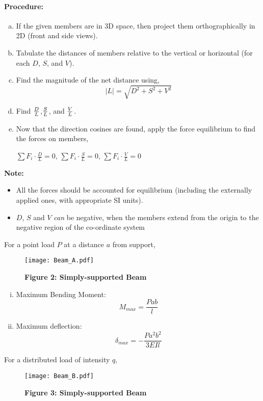 \documentclass{article}
\begin{document}
{\paragraph{\Large Procedure:}
\begin{enumerate}[(a)]
\item If the given members are in 3D space, then project them orthographically in 2D (front and side views).
\item Tabulate the distances of members relative to the vertical or horizontal (for each $D$, $S$, and $V$).
\item Find the magnitude of the net distance using,
{\LARGE $$|L|=\sqrt{D^2+S^2+V^2}$$}
\item Find {\LARGE $D\over L$},{\LARGE $S\over L$}, and {\LARGE $V\over L$}.
\item Now that the direction cosines are found, apply the force equilibrium to find the forces on members,
\begin{center}
{\LARGE $\sum F_i\cdot \frac{D}L=0$}, {\LARGE $\sum F_i\cdot \frac{S}L=0$}, {\LARGE $\sum F_i\cdot \frac{V}L=0$}
\end{center}
\end{enumerate}
$\ $
\\
\textbf{\Large Note:} 
\begin{itemize}
\item All the forces should be accounted for equilibrium (including the externally applied ones, with appropriate SI units).
\item $D$, $S$ and $V$ \textit{can} be negative, when the members extend from the origin to the negative region of the co-ordinate system
\end{itemize}
\newpage
{\LARGE For a point load $P$ at a distance $a$ from support,}
\begin{figure}
\caption*{\Large \textbf{Figure 2: Simply-supported Beam}}
\hbox{\hspace{-2.2cm}\texttt{[image: Beam\_A.pdf]}}
\end{figure}
\begin{enumerate}[(i)]
\item Maximum Bending Moment: {\LARGE $$M_{max}=\frac{Pab}{l}$$}
\item Maximum deflection:
{\LARGE $$\delta_{max}=-\frac{Pa^2b^2}{3EIl}{}$$}
\end{enumerate}
\newpage
{\LARGE For a distributed load of intensity $q$,}
\begin{figure}
\caption*{\Large \textbf{Figure 3: Simply-supported Beam}}
\hbox{\hspace{-2.2cm}\texttt{[image: Beam\_B.pdf]}}

\end{figure}}
\end{document}
